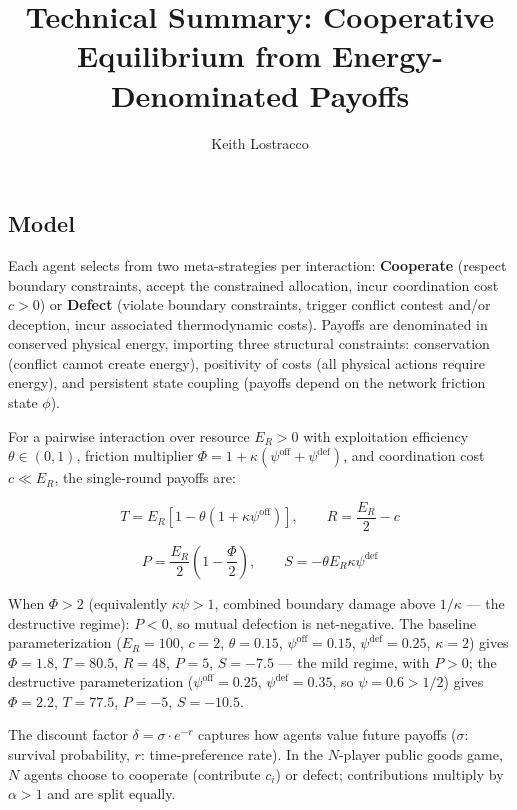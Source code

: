 \documentclass[11pt]{article}
\title{Technical Summary: Cooperative Equilibrium from
Energy-Denominated Payoffs}
\author{Keith Lostracco}
\date{}
\begin{document}
\maketitle

\subsection{Model}\label{model}

Each agent selects from two meta-strategies per interaction:
\textbf{Cooperate} (respect boundary constraints, accept the constrained
allocation, incur coordination cost \(c > 0\)) or \textbf{Defect}
(violate boundary constraints, trigger conflict contest and/or
deception, incur associated thermodynamic costs). Payoffs are
denominated in conserved physical energy, importing three structural
constraints: conservation (conflict cannot create energy), positivity of
costs (all physical actions require energy), and persistent state
coupling (payoffs depend on the network friction state \(\phi\)).

For a pairwise interaction over resource \(E_R > 0\) with exploitation
efficiency \(\theta \in (0,1)\), friction multiplier
\(\Phi = 1 + \kappa(\psi^{\text{off}} + \psi^{\text{def}})\), and
coordination cost \(c \ll E_R\), the single-round payoffs are:

\[T = E_R\left[1 - \theta(1 + \kappa\psi^{\text{off}})\right], \qquad R = \frac{E_R}{2} - c\]

\[P = \frac{E_R}{2}\left(1 - \frac{\Phi}{2}\right), \qquad S = -\theta E_R\kappa\psi^{\text{def}}\]

When \(\Phi > 2\) (equivalently \(\kappa\psi > 1\), combined boundary
damage above \(1/\kappa\) --- the destructive regime): \(P < 0\), so
mutual defection is net-negative. The baseline parameterization
(\(E_R = 100\), \(c = 2\), \(\theta = 0.15\),
\(\psi^{\text{off}} = 0.15\), \(\psi^{\text{def}} = 0.25\),
\(\kappa = 2\)) gives \(\Phi = 1.8\), \(T = 80.5\), \(R = 48\),
\(P = 5\), \(S = -7.5\) --- the mild regime, with \(P > 0\); the
destructive parameterization (\(\psi^{\text{off}} = 0.25\),
\(\psi^{\text{def}} = 0.35\), so \(\psi = 0.6 > 1/2\)) gives
\(\Phi = 2.2\), \(T = 77.5\), \(P = -5\), \(S = -10.5\).

The discount factor \(\delta = \sigma \cdot e^{-r}\) captures how agents
value future payoffs (\(\sigma\): survival probability, \(r\):
time-preference rate). In the \(N\)-player public goods game, \(N\)
agents choose to cooperate (contribute \(c_i\)) or defect; contributions
multiply by \(\alpha > 1\) and are split equally.
\end{document}
